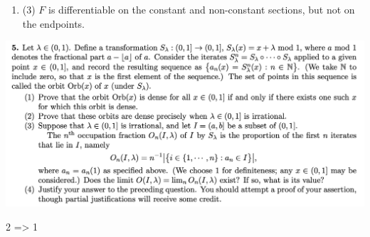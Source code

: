 \begin{enumerate}[label=(4.\arabic*)]
\begin{proof}
    Next consider $x \in C$.
  \end{proof}


\item (3) $F$ is differentiable on the constant and non-constant sections, but not on the endpoints.

\end{enumerate}



\begin{mdframed}
\includegraphics[width=400pt]{img/analysis--berkeley-202a-hw-8c2b.png}
\end{mdframed}



2 => 1








